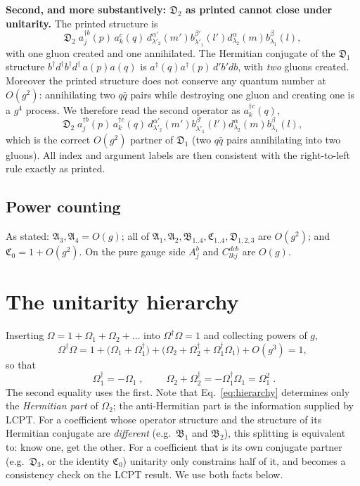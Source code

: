 \documentclass[11pt]{article}
\newcommand{\mf}{\mathfrak}
\newcommand{\dg}{\dagger}
\newcommand{\OM}{\Omega}
\begin{document}
\begin{warn}
\textbf{Second, and more substantively: $\mf D_2$ as printed cannot close under unitarity.} The
printed structure is
\[
\mf D_{2}\;a^{\dg b}_{j}(p)\,a^{c}_{k}(q)\,d^{\alpha'}_{\lambda'_{2}}(m')b^{\beta'}_{\lambda'_{1}}(l')
d^{\alpha}_{\lambda_{2}}(m)b^{\beta}_{\lambda_{1}}(l),
\]
with one gluon created and one annihilated. The Hermitian conjugate of the $\mf D_1$ structure
$b^{\dg}d^{\dg}b^{\dg}d^{\dg}\,a(p)a(q)$ is $a^{\dg}(q)a^{\dg}(p)\,d'b'db$, with \emph{two}
gluons created. Moreover the printed structure does not conserve any quantum number at $O(g^2)$:
annihilating two $q\bar q$ pairs while destroying one gluon and creating one is a $g^{4}$ process.
We therefore read the second operator as $a^{\dg c}_{k}(q)$,
\[
\mf D_{2}\;a^{\dg b}_{j}(p)\,a^{\dg c}_{k}(q)\,d^{\alpha'}_{\lambda'_{2}}(m')b^{\beta'}_{\lambda'_{1}}(l')
d^{\alpha}_{\lambda_{2}}(m)b^{\beta}_{\lambda_{1}}(l),
\]
which is the correct $O(g^{2})$ partner of $\mf D_{1}$ (two $q\bar q$ pairs annihilating into two
gluons). All index and argument labels are then consistent with the right-to-left rule exactly as
printed.
\end{warn}

\subsection{Power counting}

As stated: $\mf A_{3},\mf A_{4}=O(g)$; all of
$\mf A_{1},\mf A_{2},\mf B_{1..4},\mf C_{1..4},\mf D_{1,2,3}$ are $O(g^{2})$; and
$\mf C_{0}=1+O(g^{2})$. On the pure gauge side $A^b_j$ and $C^{dcb}_{lkj}$ are $O(g)$.

\section{The unitarity hierarchy}

Inserting $\OM=1+\OM_{1}+\OM_{2}+\dots$ into $\OM^{\dg}\OM=1$ and collecting powers of $g$,
\begin{equation}
\OM^{\dg}\OM=1+\big(\OM_{1}+\OM^{\dg}_{1}\big)
+\big(\OM_{2}+\OM^{\dg}_{2}+\OM^{\dg}_{1}\OM_{1}\big)+O(g^{3})=1,
\end{equation}
so that
\begin{equation}
\boxed{\;\OM^{\dg}_{1}=-\OM_{1}\;},
\qquad
\boxed{\;\OM_{2}+\OM^{\dg}_{2}=-\OM^{\dg}_{1}\OM_{1}=\OM_{1}^{2}\;}.
\label{eq:hierarchy}
\end{equation}
The second equality uses the first. Note that Eq.~\eqref{eq:hierarchy} determines only the
\emph{Hermitian part} of $\OM_{2}$; the anti-Hermitian part is the information supplied by LCPT.
For a coefficient whose operator structure and the structure of its Hermitian conjugate are
\emph{different} (e.g.\ $\mf B_{1}$ and $\mf B_{2}$), this splitting is equivalent to: know one,
get the other. For a coefficient that is its own conjugate partner (e.g.\ $\mf D_{3}$, or the
identity $\mf C_{0}$) unitarity only constrains half of it, and becomes a consistency check on the
LCPT result. We use both facts below.
\end{document}
